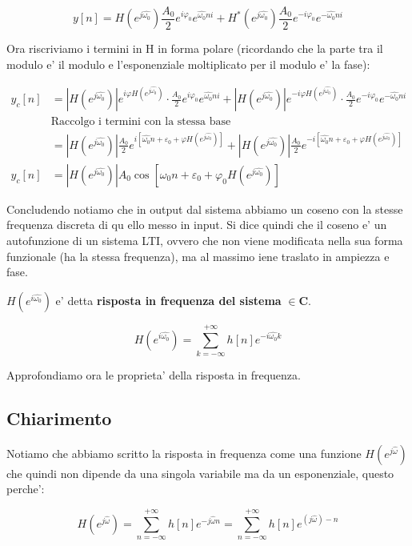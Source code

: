 \[
y[n] = H(e^{j \hat{\omega_0}}) \frac{A_0}{2} e^{i \varphi_0} e^{\hat{\omega_0}n i} + H^*(e^{j \hat{\omega_0}}) \frac{A_0}{2} e^{-i \varphi_0} e^{-\hat{\omega_0} n i}
\]

Ora riscriviamo i termini in H in forma polare (ricordando che la parte tra il modulo e' il modulo e l'esponenziale moltiplicato per il modulo e' la fase):

\[\begin{split}
    y_c[n] &= | H(e^{j \hat{\omega_0}}) | e^{i \varphi H(e^{j \hat{\omega_0}})} \cdot \frac{A_0}{2} e^{i \varphi_0} e^{\hat{\omega_0}n i} + | H(e^{j \hat{\omega_0}}) | e^{-i \varphi H(e^{j \hat{\omega_0}})} \cdot \frac{A_0}{2} e^{-i \varphi_0} e^{-\hat{\omega_0}n i} \\
    &\mbox{Raccolgo i termini con la stessa base} \\
    &= | H(e^{j \hat{\omega_0}}) | \frac{A_0}{2} e^{i[\hat{\omega_0} n + \varepsilon_0 + \varphi H (e^{j \hat{\omega_0}})]} + | H(e^{j \hat{\omega_0}}) | \frac{A_0}{2} e^{-i[\hat{\omega_0} n + \varepsilon_0 + \varphi H (e^{j \hat{\omega_0}})]} \\
    y_c[n] &= | H(e^{j \hat{\omega_0}}) | A_0 \cos [ \hat{\omega_0} n + \varepsilon_0 + \varphi_0 H (e^{j \hat{\omega_0}})]
\end{split}\]

Concludendo notiamo che in output dal sistema abbiamo un coseno con la stesse frequenza discreta di qu
ello messo in input.
Si dice quindi che il coseno e' un autofunzione di un sistema LTI, ovvero che non viene modificata nella sua forma funzionale (ha la stessa frequenza), ma al massimo iene traslato in ampiezza e fase.

$H(e^{i \hat{\omega_0}})$ e' detta \textbf{risposta in frequenza del sistema} $\in \mathbf{C}$.

\[
    H(e^{i \hat{\omega_0}}) = \sum_{k = -\infty}^{+\infty} h[n] e^{-i \hat{\omega_0} k }
\]

Approfondiamo ora le proprieta' della risposta in frequenza.

\subsection{Chiarimento}
Notiamo che abbiamo scritto la risposta in frequenza come una funzione $H(e^{j \hat{\omega}})$ che quindi non dipende da una singola variabile ma da un esponenziale, questo perche':

\[
  H(e^{j \hat{\omega}}) = \sum_{n = - \infty}^{+\infty} h[n] e^{-j \hat{\omega} n} =  \sum_{n = - \infty}^{+\infty} h[n] e^{(j \hat{\omega})-n} 
\]


